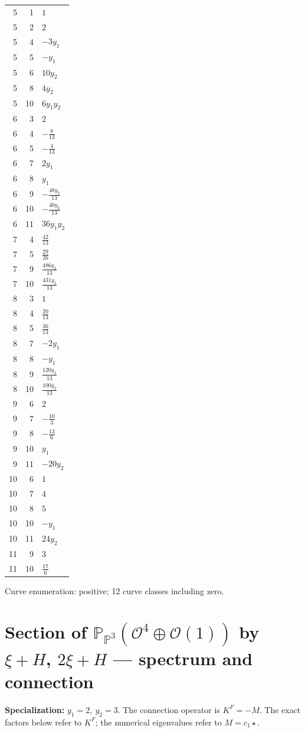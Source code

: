 \documentclass[10pt,a4paper]{article}
\begin{document}
{\begin{longtable}{rrp{125mm}}
5 & 1 & $1$\\
5 & 2 & $2$\\
5 & 4 & $- 3 y_{1}$\\
5 & 5 & $- y_{1}$\\
5 & 6 & $10 y_{2}$\\
5 & 8 & $4 y_{2}$\\
5 & 10 & $6 y_{1} y_{2}$\\
6 & 3 & $2$\\
6 & 4 & $- \frac{8}{13}$\\
6 & 5 & $- \frac{4}{13}$\\
6 & 7 & $2 y_{1}$\\
6 & 8 & $y_{1}$\\
6 & 9 & $- \frac{48 y_{2}}{13}$\\
6 & 10 & $- \frac{40 y_{2}}{13}$\\
6 & 11 & $36 y_{1} y_{2}$\\
7 & 4 & $\frac{42}{13}$\\
7 & 5 & $\frac{29}{26}$\\
7 & 9 & $\frac{486 y_{2}}{13}$\\
7 & 10 & $\frac{431 y_{2}}{13}$\\
8 & 3 & $1$\\
8 & 4 & $\frac{20}{13}$\\
8 & 5 & $\frac{36}{13}$\\
8 & 7 & $- 2 y_{1}$\\
8 & 8 & $- y_{1}$\\
8 & 9 & $\frac{120 y_{2}}{13}$\\
8 & 10 & $\frac{100 y_{2}}{13}$\\
9 & 6 & $2$\\
9 & 7 & $- \frac{10}{3}$\\
9 & 8 & $- \frac{13}{6}$\\
9 & 10 & $y_{1}$\\
9 & 11 & $- 20 y_{2}$\\
10 & 6 & $1$\\
10 & 7 & $4$\\
10 & 8 & $5$\\
10 & 10 & $- y_{1}$\\
10 & 11 & $24 y_{2}$\\
11 & 9 & $3$\\
11 & 10 & $\frac{17}{6}$\\
\end{longtable}}
Curve enumeration: positive; 12 curve classes including zero.
\clearpage\section*{Section of $\mathbb P_{\mathbb P^{3}}(\mathcal O^{4}\oplus \mathcal O(1))$ by $\xi +H$, $2\xi +H$ --- spectrum and connection}
\textbf{Specialization:} $y_1=2,\ y_2=3$. The connection operator is $K^F=-M$. The exact factors below refer to $K^F$; the numerical eigenvalues refer to $M=c_1\star$.
\end{document}

